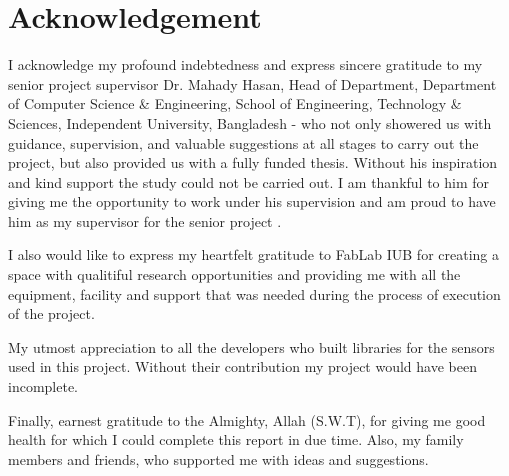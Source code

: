 \chapter*{Acknowledgement}
I acknowledge my profound indebtedness and express sincere gratitude to my senior project supervisor Dr. Mahady Hasan, Head of Department, Department of Computer Science & Engineering, School of Engineering, Technology & Sciences, Independent University, Bangladesh - who not only showered us with guidance, supervision, and valuable suggestions at all stages to carry out the project, but also provided us with a fully funded thesis. Without his inspiration and kind support the study could not be carried out. I am thankful to him for giving me the opportunity to work under his supervision and am proud to have him as my supervisor for the senior project .

I also would like to express my heartfelt gratitude to FabLab IUB for creating a space with qualitiful research opportunities and providing me with all the equipment, facility and support that was needed during the process of execution of the project. 

My utmost appreciation to all the developers who built libraries for the sensors used in this project. Without their contribution my project would have been incomplete.

Finally, earnest gratitude to the Almighty, Allah (S.W.T), for giving me good health for which I could complete this report in due time. Also, my family members and friends, who supported me with ideas and suggestions.
